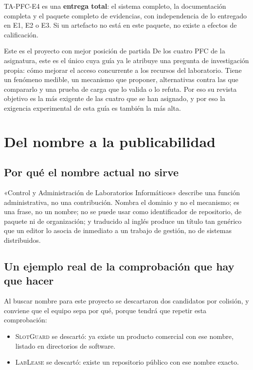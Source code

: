 \documentclass[11pt,a4paper]{article}
\begin{document}
TA-PFC-E4 es una \textbf{entrega total}: el sistema completo, la documentación completa y el paquete completo de evidencias, con independencia de lo entregado en E1, E2 o E3. Si un artefacto no está en este paquete, no existe a efectos de calificación.

\begin{aviso}{Este es el proyecto con mejor posición de partida}
	De los cuatro PFC de la asignatura, este es el único cuya guía ya le atribuye una pregunta de investigación propia: cómo mejorar el acceso concurrente a los recursos del laboratorio. Tiene un fenómeno medible, un mecanismo que proponer, alternativas contra las que compararlo y una prueba de carga que lo valida o lo refuta. Por eso su revista objetivo es la más exigente de las cuatro que se han asignado, y por eso la exigencia experimental de esta guía es también la más alta.
\end{aviso}

\section{Del nombre a la publicabilidad}

\subsection{Por qué el nombre actual no sirve}

«Control y Administración de Laboratorios Informáticos» describe una función administrativa, no una contribución. Nombra el dominio y no el mecanismo; es una frase, no un nombre; no se puede usar como identificador de repositorio, de paquete ni de organización; y traducido al inglés produce un título tan genérico que un editor lo asocia de inmediato a un trabajo de gestión, no de sistemas distribuidos.

\subsection{Un ejemplo real de la comprobación que hay que hacer}

Al buscar nombre para este proyecto se descartaron dos candidatos por colisión, y conviene que el equipo sepa por qué, porque tendrá que repetir esta comprobación:

\begin{itemize}[leftmargin=*,itemsep=3pt]
	\item \textsc{SlotGuard} se descartó: ya existe un producto comercial con ese nombre, listado en directorios de software.
	\item \textsc{LabLease} se descartó: existe un repositorio público con ese nombre exacto.
\end{itemize}
\end{document}
